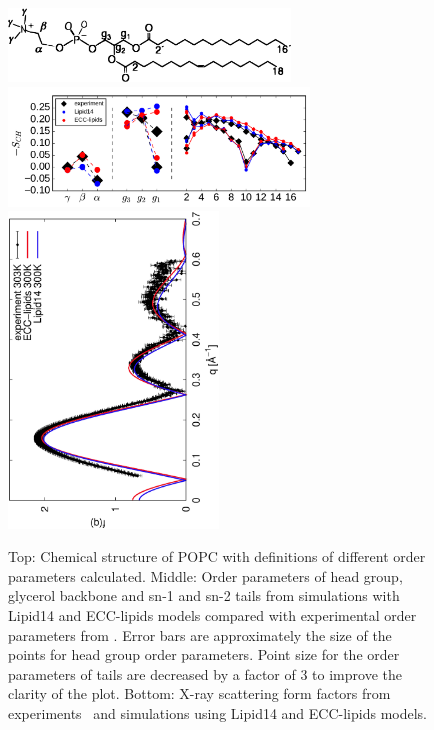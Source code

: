 \documentclass[aip,jcp,twocolumn]{revtex4}
\begin{document}
\begin{figure}[tbp]
  \centering
  \includegraphics[width=7.5cm]{../Fig/POPCstructure.eps}
  \includegraphics[width=8.0cm]{../Fig/ipython_nb/Order-parameters_exp-L14-ECCL17_q80_sig89.pdf}
  \includegraphics[height=8.4cm,angle=-90]{../Fig/form-f_exp-l14-eccl17.eps}
  \caption{\label{simVSexpNOions}
    Top: Chemical structure of POPC with definitions of different order parameters calculated.
    Middle: Order parameters of head group, glycerol backbone and sn-1 and sn-2 tails  
    from simulations with Lipid14 \cite{dickson14} and ECC-lipids models
    compared with experimental order parameters from \cite{ferreira13}.
    Error bars are approximately the size of the points for head group order parameters.
    Point size for the order parameters of tails are decreased by a factor of 3 to improve the clarity of the plot.
    Bottom: X-ray scattering form factors from experiments~\cite{Kucerka2011} and simulations using Lipid14 \cite{dickson14} and ECC-lipids models. 
    } 
\end{figure}
\end{document}
